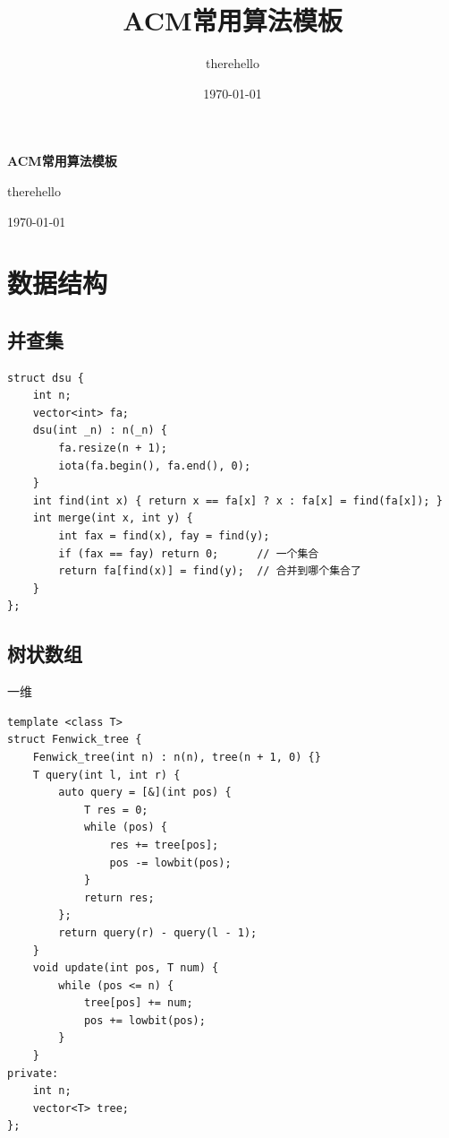 \documentclass[UTF8]{ctexart}
\title{ACM常用算法模板}
\author{therehello}
\date{\today}
\newcommand\blankpage{
    \null
    \thispagestyle{empty}
    \addtocounter{page}{-1}
    \newpage
}
\begin{document}
\begin{sloppypar}

\begin{titlepage}
    \centering
    {\fontsize{40pt}{0pt}\selectfont \textbf{ACM常用算法模板}\par} %
    \vfill %
    {\fontsize{12pt}{0pt}\selectfont therehello\par} %
    \today %
\end{titlepage}

\blankpage

\tableofcontents

\clearpage

\section{数据结构}

\subsection{并查集}

\begin{lstlisting}[style=cpp]
struct dsu {
    int n;
    vector<int> fa;
    dsu(int _n) : n(_n) {
        fa.resize(n + 1);
        iota(fa.begin(), fa.end(), 0);
    }
    int find(int x) { return x == fa[x] ? x : fa[x] = find(fa[x]); }
    int merge(int x, int y) {
        int fax = find(x), fay = find(y);
        if (fax == fay) return 0;      // 一个集合
        return fa[find(x)] = find(y);  // 合并到哪个集合了
    }
};
\end{lstlisting}

\subsection{树状数组}

一维

\begin{lstlisting}[style=cpp]
template <class T>
struct Fenwick_tree {
    Fenwick_tree(int n) : n(n), tree(n + 1, 0) {}
    T query(int l, int r) {
        auto query = [&](int pos) {
            T res = 0;
            while (pos) {
                res += tree[pos];
                pos -= lowbit(pos);
            }
            return res;
        };
        return query(r) - query(l - 1);
    }
    void update(int pos, T num) {
        while (pos <= n) {
            tree[pos] += num;
            pos += lowbit(pos);
        }
    }
private:
    int n;
    vector<T> tree;
};
\end{lstlisting}


\end{sloppypar}
\end{document}

